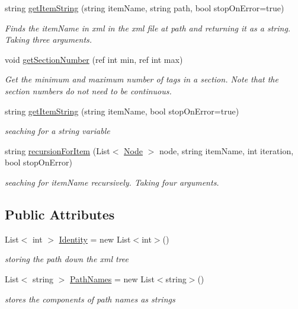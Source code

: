 \begin{DoxyCompactItemize}
string \mbox{\hyperlink{class_file_information_a39d5e80c0a0fd1eb49b76448294ba646}{get\+Item\+String}} (string item\+Name, string path, bool stop\+On\+Error=true)
\begin{DoxyCompactList}\small\item\em Finds the item\+Name in xml in the xml file at path and returning it as a string. Taking three arguments. \end{DoxyCompactList}\item 
void \mbox{\hyperlink{class_file_information_ae8fbc8bfb8316ca12118e69040172ac5}{get\+Section\+Number}} (ref int min, ref int max)
\begin{DoxyCompactList}\small\item\em Get the minimum and maximum number of tags in a section. Note that the section numbers do not need to be continuous. \end{DoxyCompactList}\item 
string \mbox{\hyperlink{class_file_information_abcfae5498145c9496138ed74aaedbdd5}{get\+Item\+String}} (string item\+Name, bool stop\+On\+Error=true)
\begin{DoxyCompactList}\small\item\em seaching for a string variable \end{DoxyCompactList}\item 
string \mbox{\hyperlink{class_file_information_a130927de30209803fd7e1c2ab7c84b69}{recursion\+For\+Item}} (List$<$ \mbox{\hyperlink{class_animal_change_1_1_node}{Node}} $>$ node, string item\+Name, int iteration, bool stop\+On\+Error)
\begin{DoxyCompactList}\small\item\em seaching for item\+Name recursively. Taking four arguments. \end{DoxyCompactList}\end{DoxyCompactItemize}
\subsection*{Public Attributes}
\begin{DoxyCompactItemize}
\item 
List$<$ int $>$ \mbox{\hyperlink{class_file_information_af9646342729b54469438752af5793d3b}{Identity}} = new List$<$int$>$()
\begin{DoxyCompactList}\small\item\em storing the path down the xml tree \end{DoxyCompactList}\item 
List$<$ string $>$ \mbox{\hyperlink{class_file_information_ab4b5c2a04bb90cbdb9b9e7fe1320ce88}{Path\+Names}} = new List$<$string$>$()
\begin{DoxyCompactList}\small\item\em stores the components of path names as strings \end{DoxyCompactList}\end{DoxyCompactItemize}


